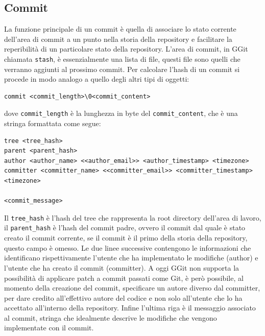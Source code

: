 \subsection{Commit}
La funzione principale di un commit è quella di associare lo stato corrente dell'area di commit a un punto nella storia della repository e facilitare la reperibilità di un particolare stato della repository.
L'area di commit, in GGit chiamata \texttt{stash}, è essenzialmente una lista di file, questi file sono quelli che verranno aggiunti al prossimo commit.
Per calcolare l'hash di un commit si procede in modo analogo a quello degli altri tipi di oggetti:
\begin{verbatim}
commit <commit_length>\0<commit_content>
\end{verbatim}
dove \texttt{commit\_length} è la lunghezza in byte del \texttt{commit\_content}, che è una stringa formattata come segue:
\begin{verbatim}
tree <tree_hash>
parent <parent_hash>
author <author_name> <<author_email>> <author_timestamp> <timezone>
committer <committer_name> <<committer_email>> <committer_timestamp> <timezone>

<commit_message>
\end{verbatim}
Il \texttt{tree\_hash} è l'hash del tree che rappresenta la root directory dell'area di lavoro, il \texttt{parent\_hash} è l'hash del commit padre, ovvero il commit dal quale è stato creato il commit corrente, se il commit è il primo della storia della repository, questo campo è omesso.
Le due linee successive contengono le informazioni che identificano rispettivamente l'utente che ha implementato le modifiche (author) e l'utente che ha creato il commit (committer). A oggi GGit non supporta la possibilità di applicare patch a commit passati come Git\cite{gitdocsauthcomm}, è però possibile, al momento della creazione del commit, specificare un autore diverso dal committer, per dare credito all'effettivo autore del codice e non solo all'utente che lo ha accettato all'interno della repository.
Infine l'ultima riga è il messaggio associato al commit, stringa che idealmente descrive le modifiche che vengono implementate con il commit.
